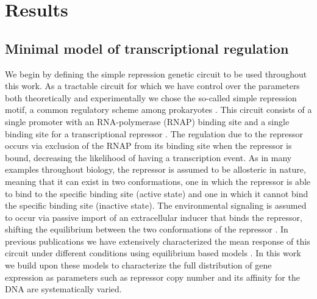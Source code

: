 \section*{Results}

\subsection*{Minimal model of transcriptional regulation}
\label{sec_model}

We begin by defining the simple repression genetic circuit to be used throughout
this work. As a tractable circuit for which we have control over the parameters
both theoretically and experimentally we chose the so-called simple  repression
motif, a common regulatory scheme among prokaryotes \cite{Rydenfelt2014}. This
circuit consists of a single promoter with an RNA-polymerase (RNAP) binding site
and a single binding site for a transcriptional repressor \cite{Garcia2011c}.
The regulation due to the repressor occurs via exclusion of the RNAP from its
binding site when the repressor is bound, decreasing the likelihood of having a
transcription event. As in many examples throughout biology, the repressor is
assumed to be allosteric in nature, meaning that it can exist in two
conformations, one in which the repressor is able to bind to the specific
binding site (active state) and one in which it cannot bind the specific binding
site (inactive state). The environmental signaling is assumed to occur via
passive import of an extracellular inducer that binds the repressor, shifting
the equilibrium between the two conformations of the repressor
\cite{Razo-Mejia2018}. In previous publications we have extensively
characterized the mean response of this circuit under different conditions using
equilibrium based models . In this work we build upon
these models to characterize the full distribution of gene expression as
parameters such as repressor copy number and its affinity for the DNA are
systematically varied.

